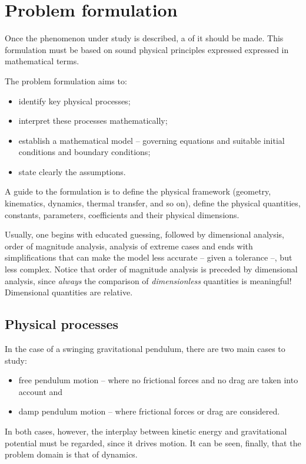 \section{Problem formulation}
Once the phenomenon under study is described, a  of it should be made. This formulation must be based on sound physical principles expressed expressed in mathematical terms.

The problem formulation aims to:
\begin{itemize}
\item identify key physical processes;
\item interpret these processes mathematically;
\item establish a mathematical model -- governing equations and suitable initial conditions and boundary conditions;
\item state clearly the assumptions.
\end{itemize}

A guide to the formulation is to define the physical framework (geometry, kinematics, dynamics, thermal transfer, and so on), define the physical quantities, constants, parameters, coefficients and their physical dimensions.

Usually, one begins with educated guessing, followed by dimensional analysis, order of magnitude analysis, analysis of extreme cases and ends with simplifications that can make the model less accurate -- given a tolerance --, but less complex. Notice that order of magnitude analysis is preceded by dimensional analysis, since \emph{always} the comparison of \emph{dimensionless} quantities is meaningful! Dimensional quantities are relative.


\subsection{Physical processes}
In the case of a swinging gravitational pendulum, there are two main cases to study:
\begin{itemize}
\item free pendulum motion -- where no frictional forces and no drag are taken into account and
\item damp pendulum motion -- where frictional forces or drag are considered.
\end{itemize}
In both cases, however, the interplay between kinetic energy and gravitational potential must be regarded, since it drives motion. It can be seen, finally, that the problem domain is that of dynamics.


